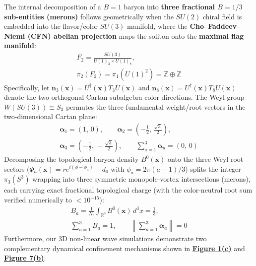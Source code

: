 \documentclass[10pt,aps,prd,twocolumn,superscriptaddress,nofootinbib,floatfix,longbibliography,showkeys]{revtex4-2}
\begin{document}
The internal decomposition of a $B = 1$ baryon into \textbf{three fractional $B = 1/3$ sub-entities (merons)} follows geometrically when the $SU(2)$ chiral field is embedded into the flavor/color $SU(3)$ manifold, where the \textbf{Cho--Faddeev--Niemi (CFN) abelian projection} \cite{ref39,ref40,ref41,ref42} maps the soliton onto the \textbf{maximal flag manifold}:
\begin{equation}\begin{gathered}
F_2 = \frac{SU(3)}{U(1)_3 \times U(1)_8}, \\
\pi_2\!\left(F_2\right) = \pi_1\!\left(U(1)^2\right) = \mathbb{Z} \oplus \mathbb{Z}
\end{gathered}\end{equation}
Specifically, let $\mathbf{n}_3(\mathbf{x}) = U^\dagger(\mathbf{x}) T_3 U(\mathbf{x})$ and $\mathbf{n}_8(\mathbf{x}) = U^\dagger(\mathbf{x}) T_8 U(\mathbf{x})$ denote the two orthogonal Cartan subalgebra color directions. The Weyl group $W(SU(3)) \cong S_3$ permutes the three fundamental weight/root vectors in the two-dimensional Cartan plane:
\begin{equation}\begin{gathered}
\boldsymbol{\alpha}_1 = (1,\,0), \qquad \boldsymbol{\alpha}_2 = \left(-\frac{1}{2},\,\frac{\sqrt{3}}{2}\right), \\
\boldsymbol{\alpha}_3 = \left(-\frac{1}{2},\,-\frac{\sqrt{3}}{2}\right), \qquad \sum_{a=1}^3 \boldsymbol{\alpha}_a = (0,\,0)
\end{gathered}\end{equation}
Decomposing the topological baryon density $B^0(\mathbf{x})$ onto the three Weyl root sectors ($\Phi_a(\mathbf{x}) = r e^{i(\phi - \phi_a)} - d_0$ with $\phi_a = 2\pi(a-1)/3$) splits the integer $\pi_3(S^3)$ wrapping into three symmetric monopole-vortex intersections (merons), each carrying exact fractional topological charge (with the color-neutral root sum verified numerically to $< 10^{-15}$):
\begin{equation}\begin{gathered}
B_a = \frac{1}{N_c}\int_{\mathbb{R}^3} B^0(\mathbf{x})\,d^3x = \frac{1}{3}, \\
\sum_{a=1}^3 B_a = 1, \qquad \left\|\sum_{a=1}^3 \boldsymbol{\alpha}_a\right\| = 0
\end{gathered}\end{equation}
Furthermore, our 3D non-linear wave simulations demonstrate two complementary dynamical confinement mechanisms shown in \textbf{\hyperref[fig:fig1]{Figure 1(c)}} and \textbf{\hyperref[fig:fig7]{Figure 7(b)}}:
\end{document}

